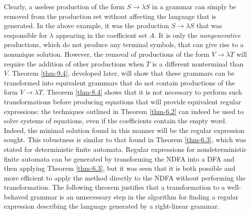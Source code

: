 Clearly, a useless production of the form $S\rightarrow\lambda S$ in a grammar
can simply be removed from the production set without affecting the language
that is generated. In the above example, it was the production $S\rightarrow
\lambda S$ that was responsible for $\lambda$ appearing in the coefficient set
$A$. It is only the \emph{nongenerative} productions, which do not produce any
terminal symbols, that can give rise to a nonunique solution. However, the
removal of productions of the form $V\rightarrow\lambda T$ will require the
addition of other productions when $T$ is a different nonterminal than $V$.
Theorem \ref{thm-9.4}, developed later, will show that these grammars can be transformed
into equivalent grammars that do not contain productions of the form $V
\rightarrow\lambda T$. Theorem \ref{thm-8.4} shows that it is not necessary to perform
such transformations before producing equations that will provide equivalent
regular expressions: the techniques outlined in Theorem \ref{thm-6.2} can indeed be used
to solve systems of equations, even if the coefficients contain the empty word.
Indeed, the minimal solution found in this manner will be the regular expression
sought. This robustness is similar to that found in Theorem \ref{thm-6.3}, which was
stated for deterministic finite automata. Regular expressions for
nondeterministic finite automata can be generated by transforming the NDFA into
a DFA and then applying Theorem \ref{thm-6.3}, but it was seen that it is both possible
and more efficient to apply the method directly to the NDFA without performing
the transformation. The following theorem justifies that a transformation to a
well-behaved grammar is an unnecessary step in the algorithm for finding a
regular expression describing the language generated by a right-linear grammar.

